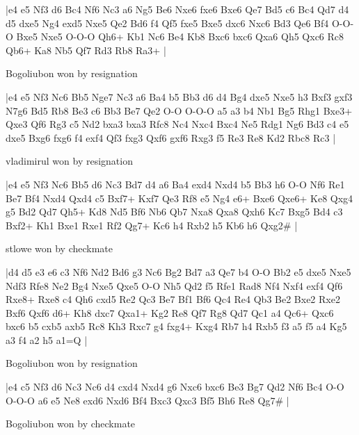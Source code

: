 \makegametitle
|e4 e5 Nf3 d6 Bc4 Nf6 Nc3 a6 Ng5 Be6 Nxe6 fxe6 Bxe6 Qe7 Bd5 c6 Bc4 Qd7 d4 d5 dxe5 Ng4 exd5 Nxe5 Qe2 Bd6 f4 Qf5 fxe5 Bxe5 dxc6 Nxc6 Bd3 Qe6 Bf4 O-O-O Bxe5 Nxe5 O-O-O Qh6+ Kb1 Nc6 Be4 Kb8 Bxc6 bxc6 Qxa6 Qh5 Qxc6 Rc8 Qb6+ Ka8 Nb5 Qf7 Rd3 Rb8 Ra3+  |

\showboard

Bogoliubon won by resignation

\makegametitle
|e4 e5 Nf3 Nc6 Bb5 Nge7 Nc3 a6 Ba4 b5 Bb3 d6 d4 Bg4 dxe5 Nxe5 h3 Bxf3 gxf3 N7g6 Bd5 Rb8 Be3 c6 Bb3 Be7 Qe2 O-O O-O-O a5 a3 b4 Nb1 Bg5 Rhg1 Bxe3+ Qxe3 Qf6 Rg3 c5 Nd2 bxa3 bxa3 Rfc8 Nc4 Nxc4 Bxc4 Ne5 Rdg1 Ng6 Bd3 c4 e5 dxe5 Bxg6 fxg6 f4 exf4 Qf3 fxg3 Qxf6 gxf6 Rxg3 f5 Re3 Re8 Kd2 Rbc8 Rc3  |

\showboard

vladimirul won by resignation

\makegametitle
|e4 e5 Nf3 Nc6 Bb5 d6 Nc3 Bd7 d4 a6 Ba4 exd4 Nxd4 b5 Bb3 h6 O-O Nf6 Re1 Be7 Bf4 Nxd4 Qxd4 c5 Bxf7+ Kxf7 Qe3 Rf8 e5 Ng4 e6+ Bxe6 Qxe6+ Ke8 Qxg4 g5 Bd2 Qd7 Qh5+ Kd8 Nd5 Bf6 Nb6 Qb7 Nxa8 Qxa8 Qxh6 Kc7 Bxg5 Bd4 c3 Bxf2+ Kh1 Bxe1 Rxe1 Rf2 Qg7+ Kc6 h4 Rxb2 h5 Kb6 h6 Qxg2\#  |

\showboard

stlowe won by checkmate

\makegametitle
|d4 d5 e3 e6 c3 Nf6 Nd2 Bd6 g3 Nc6 Bg2 Bd7 a3 Qe7 b4 O-O Bb2 e5 dxe5 Nxe5 Ndf3 Rfe8 Ne2 Bg4 Nxe5 Qxe5 O-O Nh5 Qd2 f5 Rfe1 Rad8 Nf4 Nxf4 exf4 Qf6 Rxe8+ Rxe8 c4 Qh6 cxd5 Re2 Qc3 Be7 Bf1 Bf6 Qc4 Re4 Qb3 Be2 Bxe2 Rxe2 Bxf6 Qxf6 d6+ Kh8 dxc7 Qxa1+ Kg2 Re8 Qf7 Rg8 Qd7 Qc1 a4 Qc6+ Qxc6 bxc6 b5 cxb5 axb5 Rc8 Kh3 Rxc7 g4 fxg4+ Kxg4 Rb7 h4 Rxb5 f3 a5 f5 a4 Kg5 a3 f4 a2 h5 a1=Q  |

\showboard

Bogoliubon won by resignation

\makegametitle
|e4 c5 Nf3 d6 Nc3 Nc6 d4 cxd4 Nxd4 g6 Nxc6 bxc6 Be3 Bg7 Qd2 Nf6 Bc4 O-O O-O-O a6 e5 Ne8 exd6 Nxd6 Bf4 Bxc3 Qxc3 Bf5 Bh6 Re8 Qg7\#  |

\showboard

Bogoliubon won by checkmate

